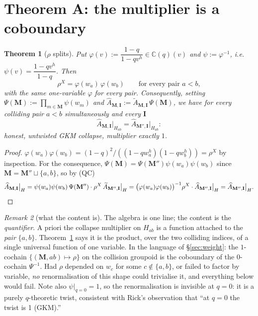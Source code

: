 \documentclass[11pt]{article}
\theoremstyle{plain}
\newtheorem{thm}{Theorem}
\theoremstyle{definition}
\theoremstyle{remark}
\newtheorem{rem}[thm]{Remark}
\theoremstyle{plain}
\newcommand{\bI}{\mathbf{I}}
\newcommand{\bM}{\mathbf{M}}
\newcommand{\At}{\widetilde{A}}
\newcommand{\Ah}{\widehat{A}}
\begin{document}
\section{Theorem A: the multiplier is a coboundary}

\begin{thm}[$\rho$ splits]\label{thm:A}
Put $\varphi(v):=\dfrac{1-q}{1-qv^{h}}\in\mathbb{C}(q)(v)$ and
$\psi:=\varphi^{-1}$, i.e.\ $\psi(v)=\dfrac{1-qv^{h}}{1-q}$.  Then
\[
  \rho^X=\varphi(w_a)\,\varphi(w_b)
  \qquad\text{for every pair } a<b,
\]
with the \emph{same} one-variable $\varphi$ for every pair.  Consequently, setting
$\Psi(\bM):=\prod_{m\in\bM}\psi(w_m)$ and
$\Ah_{\bM,\bI}:=\At_{\bM,\bI}\,\Psi(\bM)$, we have for every colliding pair
$a<b$ simultaneously and every $\bI$
\[
  \Ah_{\bM,\bI}\big|_{H_{ab}}=\Ah_{\bM'',\bI}\big|_{H_{ab}}:
\]
honest, untwisted GKM collapse, multiplier exactly $1$.
\end{thm}

\begin{proof}
$\varphi(w_a)\varphi(w_b)=(1-q)^2/((1-qw_a^h)(1-qw_b^h))=\rho^X$ by inspection.
For the consequence, $\Psi(\bM)=\Psi(\bM'')\psi(w_a)\psi(w_b)$ since
$\bM=\bM''\sqcup\{a,b\}$, so by (QC)
\[
  \Ah_{\bM,\bI}\big|_{H}
  =\psi(w_a)\psi(w_b)\,\Psi(\bM'')\cdot\rho^X\,\At_{\bM'',\bI}\big|_{H}
  =\bigl(\varphi(w_a)\varphi(w_b)\bigr)^{-1}\rho^X\cdot\Ah_{\bM'',\bI}\big|_{H}
  =\Ah_{\bM'',\bI}\big|_{H}. \qedhere
\]
\end{proof}

\begin{rem}[what the content is]
The algebra is one line; the content is the \emph{quantifier}.  A priori the
collapse multiplier on $H_{ab}$ is a function attached to the \emph{pair}
$\{a,b\}$.  Theorem~\ref{thm:A} says it is the product, over the two colliding
indices, of a single universal function of one variable.  In the language of
\S\ref{sec:weight}: the $1$-cochain $\{(\bM,ab)\mapsto\rho\}$ on the collision
groupoid is the coboundary of the $0$-cochain $\Psi^{-1}$.  Had $\rho$ depended on
$w_c$ for some $c\notin\{a,b\}$, or failed to factor by variable, \emph{no}
renormalisation of this shape could trivialise it, and everything below would
fail.  Note also $\psi|_{q=0}=1$, so the renormalisation is invisible at $q=0$: it
is a purely $q$-theoretic twist, consistent with Rick's observation that
``at $q=0$ the twist is 1 (GKM).''
\end{rem}

\end{document}
